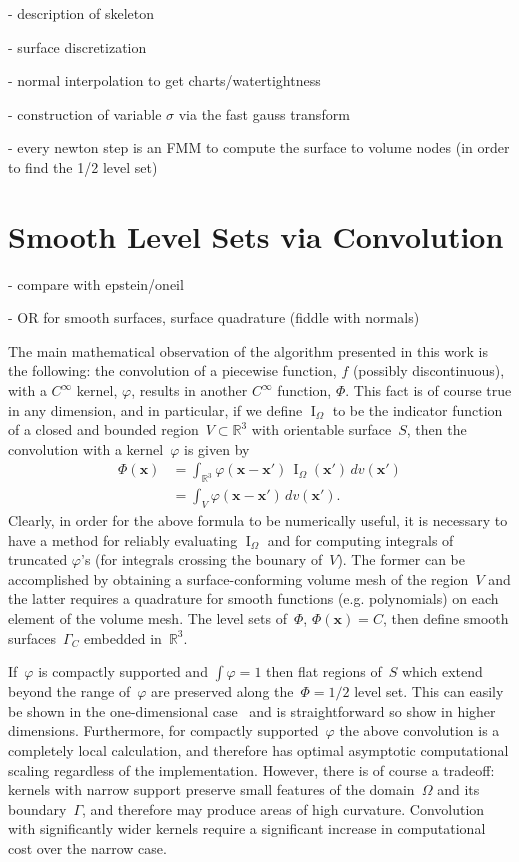 \documentclass[11pt]{article}
\DeclareMathOperator\indic{I}
\newcommand\bbR{\mathbb R}
\newcommand\bx{\boldsymbol x}
\renewcommand{\phi}{\varphi}
\begin{document}
- description of skeleton

- surface discretization

- normal interpolation to get charts/watertightness

- construction of variable $\sigma$ via the fast gauss transform

- every newton step is an FMM to compute the surface to volume nodes
(in order to find the 1/2 level set)



\section{Smooth Level Sets via Convolution}



- compare with epstein/oneil



- OR for smooth surfaces, surface quadrature (fiddle with normals)



The main mathematical observation of the algorithm presented in this
work is the following: the convolution of a piecewise function, $f$
(possibly discontinuous), with a $C^\infty$ kernel, $\phi$, results in
another $C^\infty$ function, $\Phi$. This fact is of course true in any
dimension, and in particular, if we define $\indic_\Omega$ to be the
indicator function of a closed and bounded
region~$V \subset \bbR^3$ with orientable surface~$S$, then
the convolution with a kernel~$\phi$ is given by
\begin{equation}
\begin{aligned}
\Phi(\bx) &= \int_{\bbR^3} \phi(\bx-\bx') \, \indic_\Omega(\bx') \, dv(\bx') \\
 &= \int_{V} \phi(\bx-\bx')  \, dv(\bx').
\end{aligned}
\end{equation}
Clearly, in order for the above formula to be numerically useful, it
is necessary to have a method for reliably evaluating $\indic_\Omega$
and for computing integrals of truncated $\phi$'s (for integrals
crossing the bounary of~$V$). The former can be
accomplished by obtaining a surface-conforming volume mesh of the
region~$V$ and the latter requires a quadrature for smooth
functions (e.g. polynomials) on each element of the volume mesh. The
level sets of~$\Phi$, $\Phi(\bx) = C$, then define smooth
surfaces~$\Gamma_C$ embedded in~$\bbR^3$.

If~$\phi$ is compactly supported and $\int \phi = 1$ then flat regions
of~$S$ which extend beyond the range of~$\phi$ are preserved
along the~$\Phi = 1/2$ level set. This can easily be shown in the
one-dimensional case~\cite{epstein_2016} and is straightforward so
show in higher dimensions. Furthermore, for compactly supported~$\phi$
the above convolution is a completely local calculation, and therefore
has optimal asymptotic computational scaling regardless of the
implementation. However, there is of course a tradeoff: kernels with
narrow support preserve small features of the domain~$\Omega$ and its
boundary~$\Gamma$, and therefore may produce areas of high
curvature. Convolution with significantly wider kernels require a
significant increase in computational cost over the narrow case.
\end{document}
